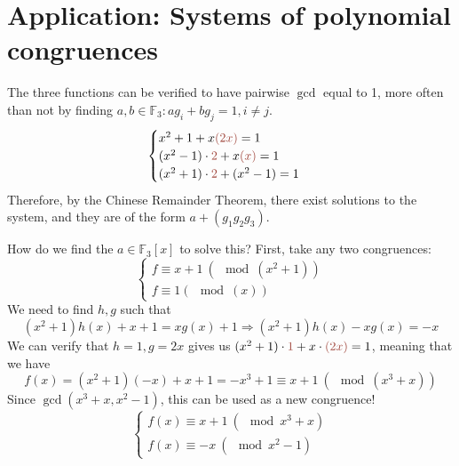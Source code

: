 \section*{Application: Systems of polynomial congruences}

The three functions can be verified to have pairwise $\gcd$ equal to 1, more often than not by finding $a, b \in \mathbb{F}_3: ag_i + bg_j = 1, i \neq j$.
\[
  \begin{cases}
    x^2 + 1 + x{\color{redish}(2x)} = 1 \\
    (x^2 - 1)\cdot{\color{redish}2} + x{\color{redish}(x)} = 1 \\
    (x^2 + 1)\cdot{\color{redish}2} + (x^2 - 1) = 1
  \end{cases}
\] 
Therefore, by the Chinese Remainder Theorem, there exist solutions to the system, and they are of the form $a + (g_1g_2g_3)$. 

How do we find the $a \in \mathbb{F}_3[x]$ to solve this? First, take any two congruences: 
\[
  \begin{cases}
    f \equiv x + 1 \ (\mod (x^2 + 1)) \\
    f \equiv 1 (\mod (x))
  \end{cases}
\]
We need to find $h, g$ such that 
\[
  (x^2 + 1)h(x) + x + 1 = x g(x) + 1 \Rightarrow (x^2 + 1)h(x) - xg(x) = -x
\]
We can verify that $h = 1, g = 2x$ gives us $(x^2 + 1) \cdot {\color{redish}1} + x \cdot {\color{redish}(2x)} = 1$, meaning that we have 
\[
  f(x) = (x^2 + 1)(-x) + x + 1 = -x^3 + 1 \equiv x + 1 \ (\mod (x^3 + x))
\]
Since $\gcd(x^3 + x, x^2 - 1)$, this can be used as a new congruence!
\[
  \begin{cases}
    f(x) \equiv x + 1 \ (\mod x^3 + x) \\
    f(x) \equiv -x \ (\mod x^2 - 1)
  \end{cases}
\]

